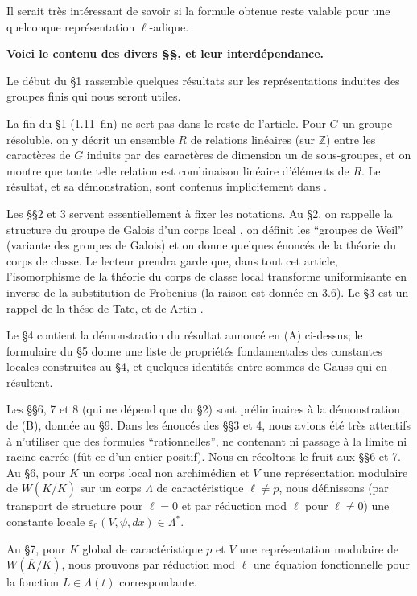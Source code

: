 \documentclass[11pt,a4paper]{amsart}
\theoremstyle{plain}
\theoremstyle{definition}
\newcommand{\dbZ}{\mathbb{Z}}
\newcommand{\ov}[1]{\overline{#1}}
\newcommand{\eps}{\varepsilon}
\begin{document}
Il serait tr\`es int\'eressant de savoir si la formule obtenue reste valable pour une quelconque repr\'esentation $\ell$-adique.

\medskip
\noindent
\textbf{Voici le contenu des divers \S\S, et leur interd\'ependance.}

\medskip
Le d\'ebut du \S1 rassemble quelques r\'esultats sur les repr\'esentations induites des groupes finis qui nous seront utiles.

La fin du \S1 (1.11--fin) ne sert pas dans le reste de l'article. Pour $G$ un groupe r\'esoluble, on y d\'ecrit un ensemble $R$ de relations lin\'eaires (sur $\dbZ$) entre les caract\`eres de $G$ induits par des caract\`eres de dimension un de sous-groupes, et on montre que toute telle relation est combinaison lin\'eaire d'\'el\'ements de $R$. Le r\'esultat, et sa d\'emonstration, sont contenus implicitement dans \cite{9}.

Les \S\S2 et 3 servent essentiellement \`a fixer les notations. Au \S2, on rappelle la structure du groupe de Galois d'un corps local \cite{10}, on d\'efinit les ``groupes de Weil'' (variante des groupes de Galois) et on donne quelques \'enonc\'es de la th\'eorie du corps de classe. Le lecteur prendra garde que, dans tout cet article, l'isomorphisme de la th\'eorie du corps de classe local transforme uniformisante en inverse de la substitution de Frobenius (la raison est donn\'ee en 3.6). Le \S3 est un rappel de la th\'ese de Tate, et de Artin \cite{1}.

Le \S4 contient la d\'emonstration du r\'esultat annonc\'e en (A) ci-dessus; le formulaire du \S5 donne une liste de propri\'et\'es fondamentales des constantes locales construites au \S4, et quelques identit\'es entre sommes de Gauss qui en r\'esultent.

Les \S\S6, 7 et 8 (qui ne d\'epend que du \S2) sont pr\'eliminaires \`a la d\'emonstration de (B), donn\'ee au \S9. Dans les \'enonc\'es des \S\S3 et 4, nous avions \'et\'e tr\`es attentifs \`a n'utiliser que des formules ``rationnelles'', ne contenant ni passage \`a la limite ni racine carr\'ee (f\^ut-ce d'un entier positif). Nous en r\'ecoltons le fruit aux \S\S6 et 7. Au \S6, pour $K$ un corps local non archim\'edien et $V$ une repr\'esentation modulaire de $W(\ov{K}/K)$ sur un corps $\Lambda$ de caract\'eristique $\ell \not= p$, nous d\'efinissons (par transport de structure pour $\ell = 0$ et par r\'eduction mod $\ell$ pour $\ell \not= 0$) une constante locale $\eps_{0}(V,\psi,dx) \in \Lambda^{*}$.

Au \S7, pour $K$ global de caract\'eristique $p$ et $V$ une repr\'esentation modulaire de $W(\ov{K}/K)$, nous prouvons par r\'eduction mod $\ell$ une \'equation fonctionnelle pour la fonction $L \in \Lambda(t)$ correspondante.
\end{document}
